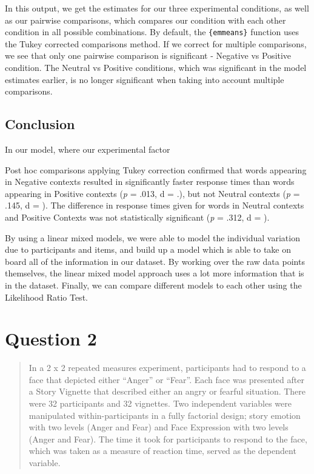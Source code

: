 \documentclass[
]{article}
\begin{document}
In this output, we get the estimates for our three experimental
conditions, as well as our pairwise comparisons, which compares our
condition with each other condition in all possible combinations. By
default, the \texttt{\{emmeans\}} function uses the Tukey corrected
comparisons method. If we correct for multiple comparisons, we see that
only one pairwise comparison is significant - Negative vs Positive
condition. The Neutral vs Positive conditions, which was significant in
the model estimates earlier, is no longer significant when taking into
account multiple comparisons.

\hypertarget{conclusion}{%
\subsection{Conclusion}\label{conclusion}}

In our model, where our experimental factor

Post hoc comparisons applying Tukey correction confirmed that words
appearing in Negative contexts resulted in significantly faster response
times than words appearing in Positive contexts (\emph{p} = .013, d =
.), but not Neutral contexts (\emph{p} = .145, d = ). The difference in
response times given for words in Neutral contexts and Positive Contexts
was not statistically significant (\emph{p} = .312, d = ).

By using a linear mixed models, we were able to model the individual
variation due to participants and items, and build up a model which is
able to take on board all of the information in our dataset. By working
over the raw data points themselves, the linear mixed model approach
uses a lot more information that is in the dataset. Finally, we can
compare different models to each other using the Likelihood Ratio Test.

\hypertarget{question-2}{%
\section{Question 2}\label{question-2}}

\begin{quote}
In a 2 x 2 repeated measures experiment, participants had to respond to
a face that depicted either ``Anger'' or ``Fear''. Each face was
presented after a Story Vignette that described either an angry or
fearful situation. There were 32 participants and 32 vignettes. Two
independent variables were manipulated within-participants in a fully
factorial design; story emotion with two levels (Anger and Fear) and
Face Expression with two levels (Anger and Fear). The time it took for
participants to respond to the face, which was taken as a measure of
reaction time, served as the dependent variable.
\end{quote}
\end{document}
